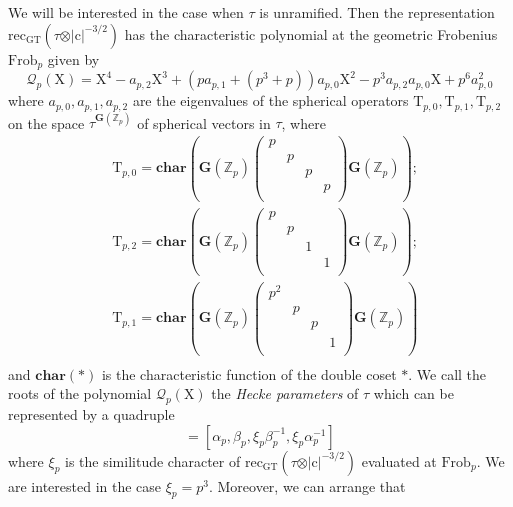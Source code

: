 \documentclass[10pt]{amsart}
\numberwithin{equation}{section}
\theoremstyle{definition}
\def\calQ{\mathcal{Q}}
\def\bfG{\mathbf{G}}
\def\ZZ{\mathbb{Z}}
\def\rmc{\mathrm{c}}
\def\rmX{\mathrm{X}}
\def\rmT{\mathrm{T}}
\begin{document}
We will be interested in the case when $\tau$ is unramified. Then the representation $\mathrm{rec}_{\mathrm{GT}}(\tau\otimes\vert\rmc\vert^{-3/2})$ has the characteristic polynomial at the geometric Frobenius $\mathrm{Frob}_{p}$ given by
\begin{equation*}
\mathcal{Q}_{p}(\rmX)=\rmX^{4}- {a}_{p,2}\rmX^{3}+ (p{a}_{p,1}+(p^{3}+p)){a}_{p,0}\rmX^{2}-p^{3}{a}_{p,2}{a}_{p,0}\rmX+p^{6}{a}^{2}_{p,0}
\end{equation*}
where ${a}_{p, 0}, {a}_{p, 1},{a}_{p, 2}$ are the eigenvalues of the spherical operators $\mathrm{T}_{p,0}, \mathrm{T}_{p,1}, \mathrm{T}_{p,2}$ on the space $\tau^{\mathbf{G}(\ZZ_{p})}$ of spherical vectors in $\tau$, where 
\begin{equation}\label{Hecke-operators}
\begin{split}
&\rmT_{p,0}=\mathbf{char}(\bfG(\ZZ_{p})\begin{pmatrix}p&&&\\&p&&\\&&p&\\&&&p\\\end{pmatrix}\bfG(\ZZ_{p}));\\
&\rmT_{p,2}=\mathbf{char}(\bfG(\ZZ_{p})\begin{pmatrix}p&&&\\& p&&\\&&1&\\&&&1\\\end{pmatrix}\bfG(\ZZ_{p}));\\
&\rmT_{p,1}=\mathbf{char}(\bfG(\ZZ_{p})\begin{pmatrix}p^{2} &&&\\&p&&\\&&p&\\&&& 1\\\end{pmatrix}\bfG(\ZZ_{p}))\\
\end{split}
\end{equation}
and $\mathbf{char}(\ast)$ is the characteristic function of the double coset $\ast$. We call the roots of the polynomial $\calQ_{p}(\rmX)$ the {\em Hecke parameters} of $\tau$ which can be represented by a quadruple
\begin{equation*}
[\alpha_{p}, \beta_{p}, \gamma_{p}, \delta_{p}]=[\alpha_{p}, \beta_{p}, \xi_{p}\beta^{-1}_{p}, \xi_{p}\alpha^{-1}_{p}] 
\end{equation*}
where $\xi_{p}$ is the similitude character of  $\mathrm{rec}_{\mathrm{GT}}(\tau\otimes\vert \rmc\vert^{-3/2})$ evaluated at $\mathrm{Frob}_{p}$. We are interested in the case $\xi_{p}=p^{3}$.  Moreover,  we can arrange that
\end{document}
